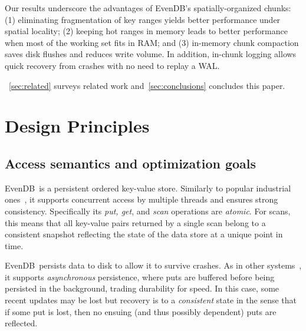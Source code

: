 \documentclass[sigplan,10pt]{acmart}
\newcommand{\sys}{EvenDB}
\begin{document}
Our results underscore the advantages of \sys's spatially-organized chunks:
(1) eliminating fragmentation of key ranges  yields better  performance under spatial locality; 
(2) keeping hot ranges in memory leads to better performance when most of the working set fits in RAM; and 
(3) in-memory chunk compaction saves disk flushes and reduces write volume.  
In addition, in-chunk logging allows quick recovery from crashes with no need to replay a WAL.


~\cref{sec:related}  surveys related work and~\cref{sec:conclusions} concludes this paper. 


\section{Design Principles}
\label{sec:principles}

\subsection{Access semantics and optimization goals}
\sys\ is a persistent ordered key-value store. Similarly to popular industrial ones~\cite{hbase,leveldb,RocksDB}, 
it supports concurrent access by multiple threads and ensures strong consistency. 
Specifically its \emph{put, get}, and \emph{scan} operations are \emph{atomic}.  
For scans, this means that all key-value pairs returned by a single scan belong to a consistent 
snapshot reflecting the state of the data store at a unique point in time.

\sys\ persists data to disk to allow it to survive crashes.
As in other systems~\cite{leveldb,RocksDB},  it supports
\emph{asynchronous} persistence, where puts are buffered before being persisted in the background,  
 trading durability for speed. In this case, some recent updates may be lost but 
 recovery is to a \emph{consistent} state  in the sense that 
if some put is lost, then no ensuing (and thus possibly dependent) puts are reflected.
\end{document}
